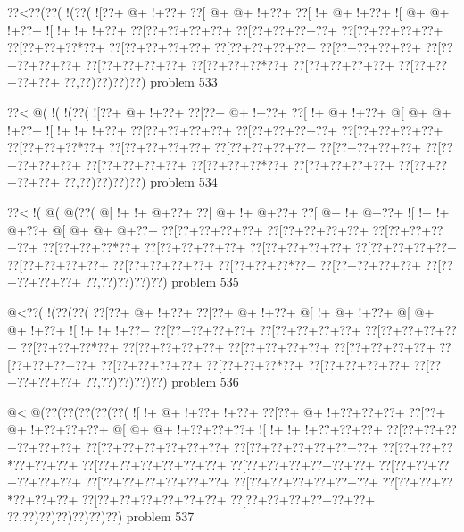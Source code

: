 \vbox{\vbox{\goo
\0??<\0??(\0??(\- !(\0??(
\- ![\0??+\- @+\- !+\0??+
\0??[\- @+\- @+\- !+\0??+
\0??[\- !+\- @+\- !+\0??+
\- ![\- @+\- @+\- !+\0??+
\- ![\- !+\- !+\- !+\0??+
\0??[\0??+\0??+\0??+\0??+
\0??[\0??+\0??+\0??+\0??+
\0??[\0??+\0??+\0??+\0??+
\0??[\0??+\0??+\0??*\0??+
\0??[\0??+\0??+\0??+\0??+
\0??[\0??+\0??+\0??+\0??+
\0??[\0??+\0??+\0??+\0??+
\0??[\0??+\0??+\0??+\0??+
\0??[\0??+\0??+\0??+\0??+
\0??[\0??+\0??+\0??*\0??+
\0??[\0??+\0??+\0??+\0??+
\0??[\0??+\0??+\0??+\0??+
\0??,\0??)\0??)\0??)\0??)
}
\hfil problem 533\hfil\break
}

\vbox{\vbox{\goo
\0??<\- @(\- !(\- !(\0??(
\- ![\0??+\- @+\- !+\0??+
\0??[\0??+\- @+\- !+\0??+
\0??[\- !+\- @+\- !+\0??+
\- @[\- @+\- @+\- !+\0??+
\- ![\- !+\- !+\- !+\0??+
\0??[\0??+\0??+\0??+\0??+
\0??[\0??+\0??+\0??+\0??+
\0??[\0??+\0??+\0??+\0??+
\0??[\0??+\0??+\0??*\0??+
\0??[\0??+\0??+\0??+\0??+
\0??[\0??+\0??+\0??+\0??+
\0??[\0??+\0??+\0??+\0??+
\0??[\0??+\0??+\0??+\0??+
\0??[\0??+\0??+\0??+\0??+
\0??[\0??+\0??+\0??*\0??+
\0??[\0??+\0??+\0??+\0??+
\0??[\0??+\0??+\0??+\0??+
\0??,\0??)\0??)\0??)\0??)
}
\hfil problem 534\hfil\break
}

\vbox{\vbox{\goo
\0??<\- !(\- @(\- @(\0??(
\- @[\- !+\- !+\- @+\0??+
\0??[\- @+\- !+\- @+\0??+
\0??[\- @+\- !+\- @+\0??+
\- ![\- !+\- !+\- @+\0??+
\- @[\- @+\- @+\- @+\0??+
\0??[\0??+\0??+\0??+\0??+
\0??[\0??+\0??+\0??+\0??+
\0??[\0??+\0??+\0??+\0??+
\0??[\0??+\0??+\0??*\0??+
\0??[\0??+\0??+\0??+\0??+
\0??[\0??+\0??+\0??+\0??+
\0??[\0??+\0??+\0??+\0??+
\0??[\0??+\0??+\0??+\0??+
\0??[\0??+\0??+\0??+\0??+
\0??[\0??+\0??+\0??*\0??+
\0??[\0??+\0??+\0??+\0??+
\0??[\0??+\0??+\0??+\0??+
\0??,\0??)\0??)\0??)\0??)
}
\hfil problem 535\hfil\break
}

\vbox{\vbox{\goo
\- @<\0??(\- !(\0??(\0??(
\0??[\0??+\- @+\- !+\0??+
\0??[\0??+\- @+\- !+\0??+
\- @[\- !+\- @+\- !+\0??+
\- @[\- @+\- @+\- !+\0??+
\- ![\- !+\- !+\- !+\0??+
\0??[\0??+\0??+\0??+\0??+
\0??[\0??+\0??+\0??+\0??+
\0??[\0??+\0??+\0??+\0??+
\0??[\0??+\0??+\0??*\0??+
\0??[\0??+\0??+\0??+\0??+
\0??[\0??+\0??+\0??+\0??+
\0??[\0??+\0??+\0??+\0??+
\0??[\0??+\0??+\0??+\0??+
\0??[\0??+\0??+\0??+\0??+
\0??[\0??+\0??+\0??*\0??+
\0??[\0??+\0??+\0??+\0??+
\0??[\0??+\0??+\0??+\0??+
\0??,\0??)\0??)\0??)\0??)
}
\hfil problem 536\hfil\break
}

\vbox{\vbox{\goo
\- @<\- @(\0??(\0??(\0??(\0??(\0??(
\- ![\- !+\- @+\- !+\0??+\- !+\0??+
\0??[\0??+\- @+\- !+\0??+\0??+\0??+
\0??[\0??+\- @+\- !+\0??+\0??+\0??+
\- @[\- @+\- @+\- !+\0??+\0??+\0??+
\- ![\- !+\- !+\- !+\0??+\0??+\0??+
\0??[\0??+\0??+\0??+\0??+\0??+\0??+
\0??[\0??+\0??+\0??+\0??+\0??+\0??+
\0??[\0??+\0??+\0??+\0??+\0??+\0??+
\0??[\0??+\0??+\0??*\0??+\0??+\0??+
\0??[\0??+\0??+\0??+\0??+\0??+\0??+
\0??[\0??+\0??+\0??+\0??+\0??+\0??+
\0??[\0??+\0??+\0??+\0??+\0??+\0??+
\0??[\0??+\0??+\0??+\0??+\0??+\0??+
\0??[\0??+\0??+\0??+\0??+\0??+\0??+
\0??[\0??+\0??+\0??*\0??+\0??+\0??+
\0??[\0??+\0??+\0??+\0??+\0??+\0??+
\0??[\0??+\0??+\0??+\0??+\0??+\0??+
\0??,\0??)\0??)\0??)\0??)\0??)\0??)
}
\hfil problem 537\hfil\break
}

